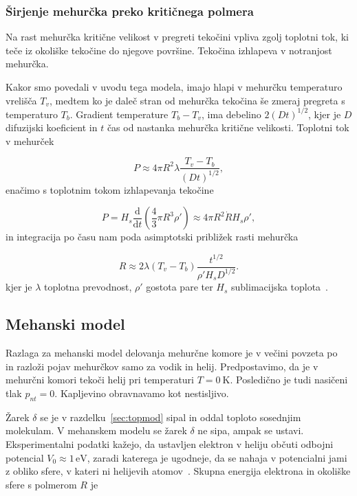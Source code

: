 \subsubsection*{Širjenje mehurčka preko kritičnega polmera}

Na rast mehurčka kritične velikost v pregreti tekočini vpliva zgolj toplotni tok, ki teče iz okoliške tekočine do njegove površine. Tekočina izhlapeva v notranjost mehurčka.

Kakor smo povedali v uvodu tega modela, imajo hlapi v mehurčku temperaturo vrelišča \( T_v \), medtem ko je daleč stran od mehurčka tekočina še zmeraj pregreta s temperaturo \( T_b \). Gradient temperature \( T_{b} - T_v \), ima debelino \( 2 {\left( D t \right)}^{1/2} \), kjer je \( D \) difuzijski koeficient in \( t \) čas od nastanka mehurčka kritične velikosti. Toplotni tok v mehurček

\[ P \approx 4 \pi R ^2 \lambda \frac{T_v - T_b}{\left( Dt \right)^{1/2}},
\]
enačimo s toplotnim tokom izhlapevanja tekočine

\[ P = H_s \frac{\mathrm{d} }{\mathrm{d} t} \left( \frac{4}{3} \pi R ^3 \rho' \right) \approx 4 \pi R ^2 \dot{R} H_s \rho', 
\]
in integracija po času nam poda asimptotski približek rasti mehurčka

\[  R \approx 2 \lambda \left( T_v - T_b \right) \frac{t^{1/2}}{\rho' H_s D^{1/2}}.
\]
kjer je \( \lambda \) toplotna prevodnost, \( \rho' \) gostota pare ter \( H_s \) sublimacijska toplota~\cite{plesset_growth_1954}. 

\subsection{Mehanski model}\label{sec:mehmod}

Razlaga za mehanski model delovanja mehurčne komore je v večini povzeta po~\cite{konstantinov_how_1998} in razloži pojav mehurčkov samo za vodik in helij. Predpostavimo, da je v mehurčni komori tekoči helij pri temperaturi \( T = 0 \ \mathrm{K} \). Posledično je tudi nasičeni tlak \( p_{nt} = 0 \). Kapljevino obravnavamo kot nestisljivo.

Žarek \( \delta \) se je v razdelku~\ref{sec:topmod} sipal in oddal toploto sosednjim molekulam. V mehanskem modelu se žarek \( \delta \) ne sipa, ampak se ustavi. Eksperimentalni podatki kažejo, da ustavljen elektron v heliju občuti odbojni potencial \( V_0 \approx 1\, \mathrm{eV} \), zaradi katerega je ugodneje, da se nahaja v potencialni jami z obliko sfere, v kateri ni helijevih atomov~\cite{classen_electrons_1998}. Skupna energija elektrona in okoliške sfere s polmerom \( R \) je

